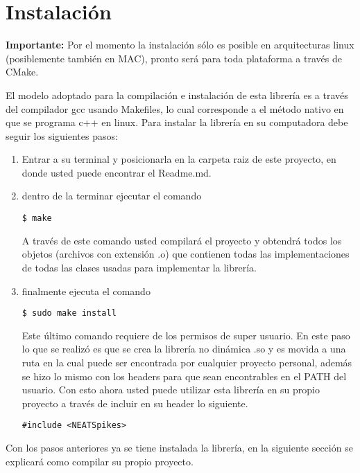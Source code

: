 \newpage
\section{Instalación}

\textbf{Importante:} Por el momento la instalación sólo es posible en arquitecturas linux (posiblemente también en MAC), pronto será para toda plataforma a través de CMake. \newline


El modelo adoptado para la compilación e instalación de esta librería es a través del compilador gcc usando Makefiles, lo cual corresponde a el método nativo en que se programa c++ en linux. Para instalar la librería en su computadora debe seguir los siguientes pasos: \newline

\begin{enumerate}
\item Entrar a su terminal y posicionarla en la carpeta raiz de este proyecto, en donde usted puede encontrar el Readme.md.
\item dentro de la terminar ejecutar el comando 
\begin{lstlisting}
$ make
\end{lstlisting}
A través de este comando usted compilará el proyecto y obtendrá todos los objetos (archivos con extensión .o) que contienen todas las implementaciones de todas las clases usadas para implementar la librería.

\item finalmente ejecuta el comando
\begin{lstlisting}
$ sudo make install
\end{lstlisting}
Este último comando requiere de los permisos de super usuario. En este paso lo que se realizó es que se crea la librería no dinámica .so y es movida a una ruta en la cual puede ser encontrada por cualquier proyecto personal, además se hizo lo mismo con los headers para que sean encontrables en el PATH del usuario. Con esto ahora usted puede utilizar esta librería en su propio proyecto a través de incluir en su header lo siguiente.
\begin{lstlisting}
#include <NEATSpikes>
\end{lstlisting}


\end{enumerate}


Con los pasos anteriores ya se tiene instalada la librería, en la siguiente sección se explicará como compilar su propio proyecto.